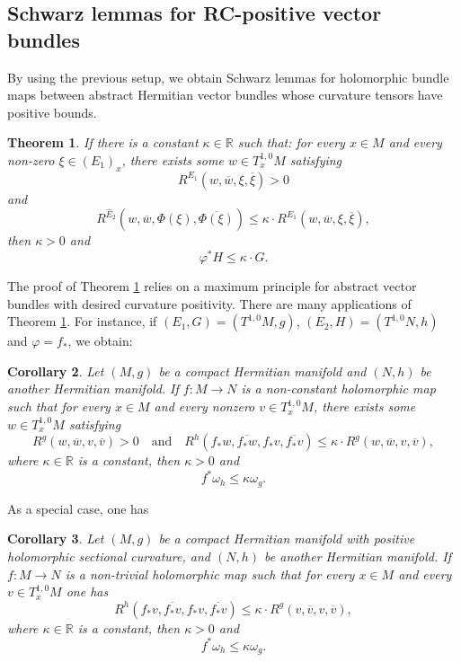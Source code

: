 \documentclass[12pt]{amsart}
\theoremstyle{plain}
\newtheorem{thm}{Theorem}[section]
\newtheorem{cor}[thm]{Corollary}
\theoremstyle{definition}
\newcommand{\btheorem}{\begin{thm}}
\newcommand{\etheorem}{\end{thm}}
\newcommand{\bcorollary}{\begin{cor}}
\newcommand{\ecorollary}{\end{cor}}
\renewcommand{\bar}{\overline}
\renewcommand{\phi}{\varphi}
\newcommand{\beq}{\begin{equation}}
\newcommand{\eeq}{\end{equation}}
\renewcommand{\hat}{\widehat}
\newcommand{\qtq}[1]{\quad\mbox{#1}\quad}
\renewcommand{\>}{\rightarrow}
\newcommand{\R}{{\mathbb R}}
\newcommand{\om}{\omega}
\numberwithin{equation}{section} %
\begin{document}
\subsection{Schwarz lemmas for RC-positive vector bundles}

\noindent  By using the previous  setup, we obtain  Schwarz lemmas for holomorphic bundle maps between abstract  Hermitian vector bundles whose curvature tensors have  positive bounds.


\btheorem\label{thm1}
If there is a constant $\kappa\in \R$ such that:  for every $x\in M$ and every non-zero $\xi\in (E_1)_x$,
there exists some $w\in T_x^{1,0}M$ satisfying
\beq
R^{E_1}\left(w,\bar w,\xi,\bar \xi\right)>0\label{RC positive vb1}
\eeq
and
\beq
R^{\hat E_2}\left(w,\bar{w},\Phi(\xi),\bar{\Phi(\xi)}\right)\le \kappa\cdot R^{E_1}\left(w,\bar w,\xi,\bar \xi\right),\label{RC positive vb111}
\eeq
then  $\kappa>0$ and
\beq
\phi^* H\le \kappa \cdot G.
\eeq
\etheorem
\noindent
 The proof of Theorem \ref{thm1} relies on a  maximum principle for abstract vector bundles with desired curvature positivity. There are many applications of Theorem \ref{thm1}. For instance, if     $(E_1, G)=\left(T^{1,0}M,g\right)$,   $\left(E_2, H\right)=\left(T^{1,0}N,h\right)$ and $\phi=f_*$, we obtain:

\bcorollary\label{key2}
Let $(M,g)$ be a compact Hermitian manifold
and $(N,h)$ be another Hermitian manifold.
If $f:M\> N$ is a non-constant holomorphic map such that for every $x\in M$ and every nonzero $v\in T_x^{1,0}M$, there exists some $w\in T_x^{1,0}M$ satisfying
\beq  R^{g}\left(w,\bar w,v,\bar v\right)>0 \qtq{and}
R^h\left(f_*w,\bar{f_*w},f_*v,\bar{f_*v}\right)\le \kappa\cdot R^g\left(w,\bar w,v,\bar v\right),
\eeq
where  $\kappa\in \R$ is a constant,
then  $\kappa>0$ and
\beq
f^*\om_h\le \kappa \om_g.
\eeq
\ecorollary

\baselineskip


\noindent
As a special case, one has
\bcorollary\label{positiveschwarz}
Let $(M,g)$ be a compact Hermitian manifold with positive holomorphic sectional curvature,
and $(N,h)$ be another Hermitian manifold.
If $f:M\to N$ is a non-trivial holomorphic map such that for every $x\in M$ and every  $v\in T_x^{1,0}M$ one has
\beq
R^h\left(f_*v,\bar{f_*v},f_*v,\bar{f_*v}\right)\le \kappa\cdot R^g\left(v,\bar v,v,\bar v\right),
\eeq
where  $\kappa\in \R$ is a constant,  then  $\kappa>0$ and
\beq
f^*\om_h\le \kappa \om_g.
\eeq
\ecorollary



 \baselineskip
\end{document}
